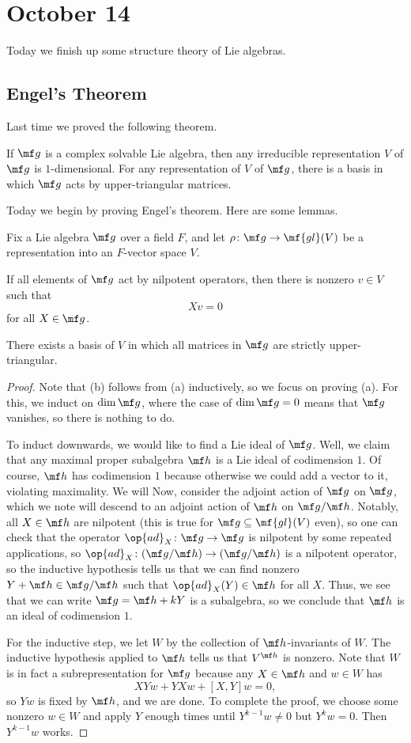 \documentclass[../notes.tex]{subfiles}
\begin{document}
\section{October 14}
Today we finish up some structure theory of Lie algebras.

\subsection{Engel's Theorem}
Last time we proved the following theorem.
\begin{theorem}[Lie]
	If $\mf g$ is a complex solvable Lie algebra, then any irreducible representation $V$ of $\mf g$ is $1$-dimensional. For any representation of $V$ of $\mf g$, there is a basis in which $\mf g$ acts by upper-triangular matrices.
\end{theorem}
Today we begin by proving Engel's theorem. Here are some lemmas.
\begin{lemma}
	Fix a Lie algebra $\mf g$ over a field $F$, and let $\rho\colon\mf g\to\mf{gl}(V)$ be a representation into an $F$-vector space $V$.
	\begin{listalph}
		\item If all elements of $\mf g$ act by nilpotent operators, then there is nonzero $v\in V$ such that
		\[Xv=0\]
		for all $X\in\mf g$.
		\item There exists a basis of $V$ in which all matrices in $\mf g$ are strictly upper-triangular.
	\end{listalph}
\end{lemma}
\begin{proof}
	Note that (b) follows from (a) inductively, so we focus on proving (a). For this, we induct on $\dim\mf g$, where the case of $\dim\mf g=0$ means that $\mf g$ vanishes, so there is nothing to do.

	To induct downwards, we would like to find a Lie ideal of $\mf g$. Well, we claim that any maximal proper subalgebra $\mf h$ is a Lie ideal of codimension $1$. Of course, $\mf h$ has codimension $1$ because otherwise we could add a vector to it, violating maximality. We will Now, consider the adjoint action of $\mf g$ on $\mf g$, which we note will descend to an adjoint action of $\mf h$ on $\mf g/\mf h$. Notably, all $X\in\mf h$ are nilpotent (this is true for $\mf g\subseteq\mf{gl}(V)$ even), so one can check that the operator $\op{ad}_X\colon\mf g\to\mf g$ is nilpotent by some repeated applications, so $\op{ad}_X\colon(\mf g/\mf h)\to(\mf g/\mf h)$ is a nilpotent operator, so the inductive hypothesis tells us that we can find nonzero $Y+\mf h\in\mf g/\mf h$ such that $\op{ad}_X(Y)\in\mf h$ for all $X$. Thus, we see that we can write $\mf g=\mf h+kY$ is a subalgebra, so we conclude that $\mf h$ is an ideal of codimension $1$.

	For the inductive step, we let $W$ by the collection of $\mf h$-invariants of $W$. The inductive hypothesis applied to $\mf h$ tells us that $V^{\mf h}$ is nonzero. Note that $W$ is in fact a subrepresentation for $\mf g$ because any $X\in\mf h$ and $w\in W$ has
	\[XYw+YXw+[X,Y]w=0,\]
	so $Yw$ is fixed by $\mf h$, and we are done. To complete the proof, we choose some nonzero $w\in W$ and apply $Y$ enough times until $Y^{k-1}w\ne0$ but $Y^kw=0$. Then $Y^{k-1}w$ works.
\end{proof}
\end{document}
